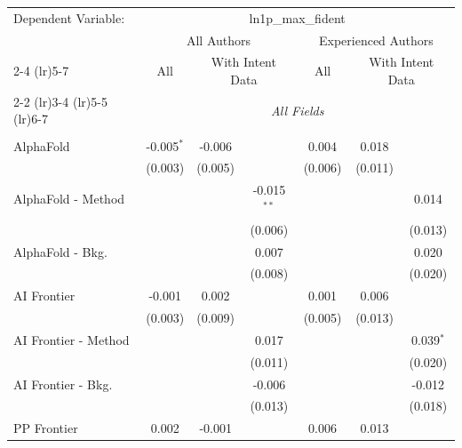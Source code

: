 \begingroup
\centering
\begin{tabular}{lcccccc}
   \tabularnewline \midrule \midrule
   Dependent Variable: & \multicolumn{6}{c}{ln1p\_max\_fident}\\
 & \multicolumn{3}{c}{All Authors} & \multicolumn{3}{c}{Experienced Authors} \\
\cmidrule(lr){2-4} \cmidrule(lr){5-7}
 & \multicolumn{1}{c}{All} & \multicolumn{2}{c}{With Intent Data} & \multicolumn{1}{c}{All} & \multicolumn{2}{c}{With Intent Data} \\
\cmidrule(lr){2-2} \cmidrule(lr){3-4} \cmidrule(lr){5-5} \cmidrule(lr){6-7}
 & \multicolumn{6}{c}{\textit{All Fields}} \\ \\
   AlphaFold            & -0.005$^{*}$ & -0.006  &               & 0.004       & 0.018   &   \\   
                        & (0.003)      & (0.005) &               & (0.006)     & (0.011) &   \\   
   AlphaFold - Method   &              &         & -0.015$^{**}$ &             &         & 0.014\\   
                        &              &         & (0.006)       &             &         & (0.013)\\   
   AlphaFold - Bkg.     &              &         & 0.007         &             &         & 0.020\\   
                        &              &         & (0.008)       &             &         & (0.020)\\   
   AI Frontier          & -0.001       & 0.002   &               & 0.001       & 0.006   &   \\   
                        & (0.003)      & (0.009) &               & (0.005)     & (0.013) &   \\   
   AI Frontier - Method &              &         & 0.017         &             &         & 0.039$^{*}$\\   
                        &              &         & (0.011)       &             &         & (0.020)\\   
   AI Frontier - Bkg.   &              &         & -0.006        &             &         & -0.012\\   
                        &              &         & (0.013)       &             &         & (0.018)\\   
   PP Frontier          & 0.002        & -0.001  &               & 0.006       & 0.013   &   \\   

\end{tabular}
